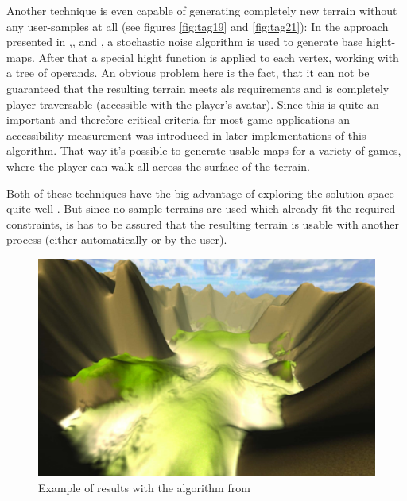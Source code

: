 Another technique is even capable of generating completely new terrain without any user-samples at all (see figures \ref{fig:tag19} and \ref{fig:tag21}): In the approach presented in \cite{frade2009breeding},\cite{frade2010evolution1},\cite{frade2010evolution2} and \cite{rodrigues2010development}, a stochastic noise algorithm is used to generate base hight-maps. After that a special hight function is applied to each vertex, working with a tree of operands. An obvious problem here is the fact, that it can not be guaranteed that the resulting terrain meets als requirements and is completely player-traversable (accessible with the player's avatar). Since this is quite an important and therefore critical criteria for most game-applications an accessibility measurement was introduced in later implementations of this algorithm. That way it's possible to generate usable maps for a variety of games, where the player can walk all across the surface of the terrain.

Both of these techniques have the big advantage of exploring the solution space quite well \cite{raffe2012survey}. But since no sample-terrains are used which already fit the required constraints, is has to be assured that the resulting terrain is usable with another process (either automatically or by the user).

\begin{figure}[htb]
	\centering
	\includegraphics[width=\linewidth]{RZL12/sjrjsrtr6zsr6z.jpg}
	\caption{Example of results with the algorithm from \cite{raffe2011evolving}}
	\label{fig:tag25}
\end{figure}

